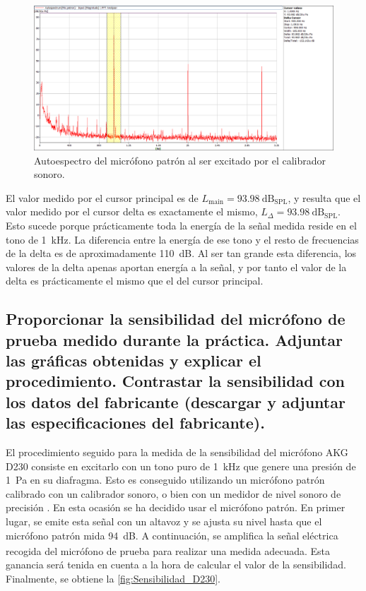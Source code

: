 \documentclass[10pt]{article}
\begin{document}
\begin{figure}[hbtp]
  \centering
  \includegraphics[width=\linewidth]{Imágenes/1. Autoespectro micrófono patrón.png}
  \caption{Autoespectro del micrófono patrón al ser excitado por el calibrador sonoro.}
  \label{fig:Autoespectro_micro_patron}
\end{figure}

El valor medido por el cursor principal es de $L_{\text{main}} = \qty{93.98}{\dB_{\text{SPL}}}$, y resulta que el valor medido por el cursor delta es exactamente el mismo, $L_{\Delta} = \qty{93.98}{\dB_{\text{SPL}}}$. Esto sucede porque prácticamente toda la energía de la señal medida reside en el tono de \qty{1}{\kilo \hertz }. La diferencia entre la energía de ese tono y el resto de frecuencias de la delta es de aproximadamente \qty{110}{\dB}. Al ser tan grande esta diferencia, los valores de la delta apenas aportan energía a la señal, y por tanto el valor de la delta es prácticamente el mismo que el del cursor principal.

\subsection{Proporcionar la sensibilidad del micrófono de prueba medido durante la práctica. Adjuntar las gráficas obtenidas y explicar el procedimiento. Contrastar la sensibilidad con los datos del fabricante (descargar y adjuntar las especificaciones del fabricante).}

El procedimiento seguido para la medida de la sensibilidad del micrófono AKG D230 consiste en excitarlo con un tono puro de \qty{1}{\kilo\hertz} que genere una presión de \qty{1}{\pascal } en su diafragma. Esto es conseguido utilizando un micrófono patrón calibrado con un calibrador sonoro, o bien con un medidor de nivel sonoro de precisión \cite[p.~315]{SSE}. En esta ocasión se ha decidido usar el micrófono patrón. En primer lugar, se emite esta señal con un altavoz y se ajusta su nivel hasta que el micrófono patrón mida \qty{94}{\dB_{}}. A continuación, se amplifica la señal eléctrica recogida del micrófono de prueba para realizar una medida adecuada. Esta ganancia será tenida en cuenta a la hora de calcular el valor de la sensibilidad. Finalmente, se obtiene la \autoref{fig:Sensibilidad_D230}.
\end{document}

